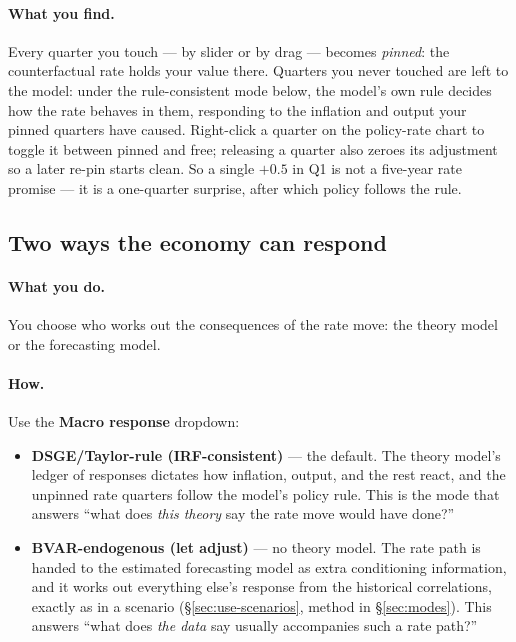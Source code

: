 \documentclass[11pt]{article}
\theoremstyle{definition}
\theoremstyle{remark}
\begin{document}
\paragraph{What you find.} Every quarter you touch --- by slider or by drag
--- becomes \emph{pinned}: the counterfactual rate holds your value there.
Quarters you never touched are left to the model: under the rule-consistent
mode below, the model's own rule decides how the rate behaves in them,
responding to the inflation and output your pinned quarters have caused.
Right-click a quarter on the policy-rate chart to toggle it between pinned
and free; releasing a quarter also zeroes its adjustment so a later re-pin
starts clean. So a single $+0.5$ in Q1 is not a five-year rate promise ---
it is a one-quarter surprise, after which policy follows the rule.

\subsection{Two ways the economy can respond}

\paragraph{What you do.} You choose who works out the consequences of the rate
move: the theory model or the forecasting model.

\paragraph{How.} Use the \textbf{Macro response} dropdown:
\begin{itemize}
  \item \textbf{DSGE/Taylor-rule (IRF-consistent)} --- the default. The theory
    model's ledger of responses dictates how inflation, output, and the rest
    react, and the unpinned rate quarters follow the model's policy rule. This
    is the mode that answers ``what does \emph{this theory} say the rate move
    would have done?''
  \item \textbf{BVAR-endogenous (let adjust)} --- no theory model. The rate
    path is handed to the estimated forecasting model as extra conditioning
    information, and it works out everything else's response from the
    historical correlations, exactly as in a scenario
    (\S\ref{sec:use-scenarios}, method in \S\ref{sec:modes}). This answers
    ``what does \emph{the data} say usually accompanies such a rate path?''
\end{itemize}
\end{document}
